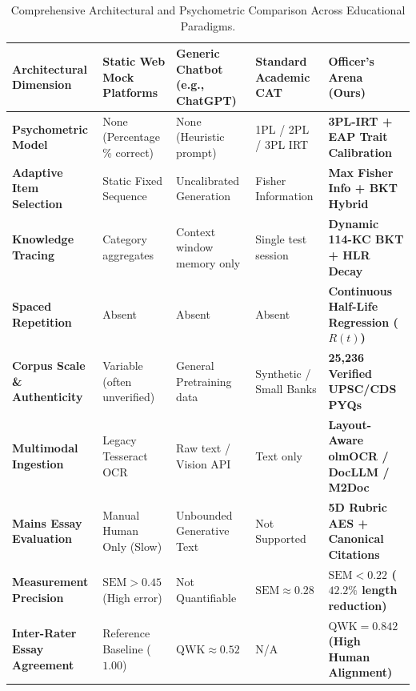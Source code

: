 \documentclass[conference]{IEEEtran}
\begin{document}
\begin{table}[t]
\centering
\caption{Comprehensive Architectural and Psychometric Comparison Across Educational Paradigms.}
\label{tab:paradigm_matrix}
\small
\begin{tabularx}{\textwidth}{lXXXX}
\toprule
\textbf{Architectural Dimension} & \textbf{Static Web Mock Platforms} & \textbf{Generic Chatbot (e.g., ChatGPT)} & \textbf{Standard Academic CAT} & \textbf{Officer's Arena (Ours)} \\
\midrule
\textbf{Psychometric Model} & None (Percentage \% correct) & None (Heuristic prompt) & 1PL / 2PL / 3PL IRT & \textbf{3PL-IRT + EAP Trait Calibration} \\
\textbf{Adaptive Item Selection} & Static Fixed Sequence & Uncalibrated Generation & Fisher Information & \textbf{Max Fisher Info + BKT Hybrid} \\
\textbf{Knowledge Tracing} & Category aggregates & Context window memory only & Single test session & \textbf{Dynamic 114-KC BKT + HLR Decay} \\
\textbf{Spaced Repetition} & Absent & Absent & Absent & \textbf{Continuous Half-Life Regression ($R(t)$)} \\
\textbf{Corpus Scale \& Authenticity} & Variable (often unverified) & General Pretraining data & Synthetic / Small Banks & \textbf{25,236 Verified UPSC/CDS PYQs} \\
\textbf{Multimodal Ingestion} & Legacy Tesseract OCR & Raw text / Vision API & Text only & \textbf{Layout-Aware olmOCR / DocLLM / M2Doc} \\
\textbf{Mains Essay Evaluation} & Manual Human Only (Slow) & Unbounded Generative Text & Not Supported & \textbf{5D Rubric AES + Canonical Citations} \\
\textbf{Measurement Precision} & $\text{SEM} > 0.45$ (High error) & Not Quantifiable & $\text{SEM} \approx 0.28$ & \textbf{$\text{SEM} < 0.22$ ($42.2\%$ length reduction)} \\
\textbf{Inter-Rater Essay Agreement} & Reference Baseline ($1.00$) & $\text{QWK} \approx 0.52$ & N/A & \textbf{$\text{QWK} = 0.842$ (High Human Alignment)} \\
\bottomrule
\end{tabularx}
\end{table}
\end{document}
